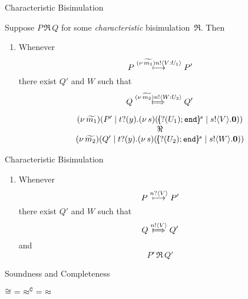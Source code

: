 \documentclass{beamer}
\begin{document}
	\begin{frame}{Characteristic Bisimulation}

		Suppose $P\, \Re\, Q$ for some {\em characteristic} bisimulation~$\Re$. Then
		\begin{enumerate}[$(\star)$]
			\item	Whenever
				\[
					P \stackrel{(\nu\, \widetilde{m_1}) n ! \langle V: U_1 \rangle}{\longmapsto} P'
				\]
				there exist $Q'$ and $W$ such that 
				\[
					Q \Hby{\news{\widetilde{m_2}} \bactout{n}{W: U_2}} Q'
				\]

				\[
					\begin{array}{c}
						\newsp{\widetilde{m_1}}{P' \Par \binp{t}{y}\newsp{s}{\mapchar{\btinp{U_1} \tinact}{s} \Par \bout{s}{V} \inact}}
						\\
						\Re
						\\
						\newsp{\widetilde{m_2}}{Q' \Par \binp{t}{y}\newsp{s}{\mapchar{\btinp{U_2} \tinact}{s} \Par \bout{s}{W} \inact}}
					\end{array}
				\]
		\end{enumerate}
	\end{frame}

	\begin{frame}{Characteristic Bisimulation}
		\begin{enumerate}[$(\star)$]
			\item	Whenever
				\[
					P \stackrel{n ? \langle V \rangle}{\longmapsto} P'
				\]
				there exist $Q'$ and $W$ such that 
				\[
					Q \Hby{\bactout{n}{V}} Q'
				\]
				and
				\[
					P'\, \Re\, Q'
				\]
		\end{enumerate}
	\end{frame}

	\begin{frame}{Soundness and Completeness}
		\begin{theorem}
			$\cong\ =\ \approx^\mathtt{C}\ =\ \approx$
		\end{theorem}
	\end{frame}

%
%
%
	
\end{document}
